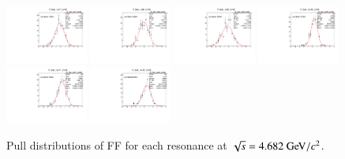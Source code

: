 \begin{figure}[h]
    \includegraphics[width=0.24\textwidth]{figure/io_full_sim/fitfrac/pull_fitfrac_res7_comb.pdf}
    \includegraphics[width=0.24\textwidth]{figure/io_full_sim/fitfrac/pull_fitfrac_res8_comb.pdf}
    \includegraphics[width=0.24\textwidth]{figure/io_full_sim/fitfrac/pull_fitfrac_res9_comb.pdf}
    \includegraphics[width=0.24\textwidth]{figure/io_full_sim/fitfrac/pull_fitfrac_res10_comb.pdf}
    \includegraphics[width=0.24\textwidth]{figure/io_full_sim/fitfrac/pull_fitfrac_res11_comb.pdf}
    \includegraphics[width=0.24\textwidth]{figure/io_full_sim/fitfrac/pull_fitfrac_res12_comb.pdf}
    \caption{Pull distributions of FF for each resonance at $\sqrt{s} = 4.682\gev/c^2$.}
\label{fig:io_full_sim_pull_ff}
\end{figure}

